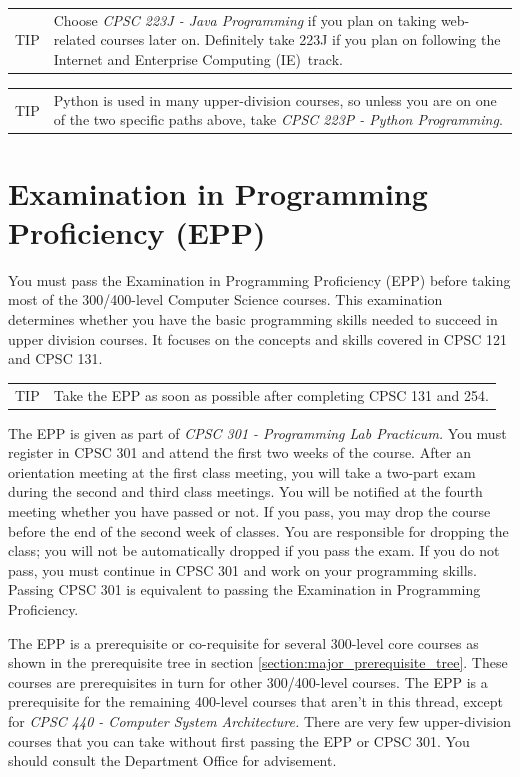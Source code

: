 \documentclass{book}
\newenvironment{tip}{
  \tcolorbox \begin{tabular}{m{.5in} m{5in}} \Large{TIP} &
}{
  \end{tabular} \endtcolorbox
}
\newcommand{\IeTrackName}{Internet and Enterprise Computing (IE)}
\begin{document}
\begin{tip}
Choose \emph{CPSC 223J - Java Programming} if you plan on taking web-related courses later on. Definitely take 223J if you plan on following the \IeTrackName~track\IeTrackIndex.
\end{tip}

\begin{tip}
  Python is used in many upper-division courses, so unless you are on one of the two specific paths above, take \emph{CPSC 223P - Python Programming}.
  \end{tip}

\section{Examination in Programming Proficiency (EPP)}
You must pass the Examination in Programming Proficiency (EPP) before taking most of the 300/400-level Computer Science courses. This examination determines whether you have the basic programming skills needed to succeed in upper division courses. It focuses on the concepts and skills covered in CPSC 121 and CPSC 131.

\begin{tip}
  Take the EPP as soon as possible after completing CPSC 131 and 254.
  \end{tip}

The EPP is given as part of \emph{CPSC 301 - Programming Lab Practicum.} You must register in CPSC 301 and attend the first two weeks of the course. After an orientation meeting at the first class meeting, you will take a two-part exam during the second and third class meetings. You will be notified at the fourth meeting whether you have passed or not. If you pass, you may drop the course before the end of the second week of classes. You are responsible for dropping the class; you will not be automatically dropped if you pass the exam. If you do not pass, you must continue in CPSC 301 and work on your programming skills. Passing CPSC 301 is equivalent to passing the Examination in Programming Proficiency.

The EPP is a prerequisite or co-requisite for several 300-level core courses as shown in the prerequisite tree in section \ref{section:major_prerequisite_tree}. These courses are prerequisites in turn for other 300/400-level courses. The EPP is a prerequisite for the remaining 400-level courses that aren’t in this thread, except for \emph{CPSC 440 - Computer System Architecture.} There are very few upper-division courses that you can take without first passing the EPP or CPSC 301. You should consult the Department Office for advisement.
\end{document}
